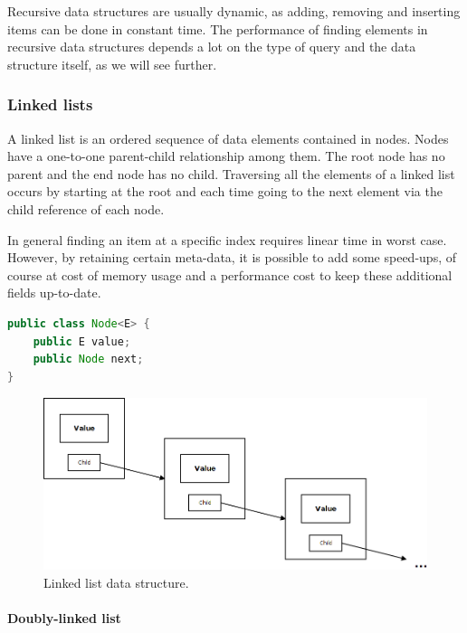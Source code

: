 Recursive data structures are usually dynamic, as adding, removing and inserting items can be done in constant time. The performance of finding elements in recursive data structures depends a lot on the type of query and the data structure itself, as we will see further.


\subsubsection{Linked lists}

A linked list is an ordered sequence of data elements contained in nodes. Nodes have a one-to-one parent-child relationship among them. The root node has no parent and the end node has no child. Traversing all the elements of a linked list occurs by starting at the root and each time going to the next element via the child reference of each node.

In general finding an item at a specific index requires linear time in worst case. However, by retaining certain meta-data, it is possible to add some speed-ups, of course at cost of memory usage and a performance cost to keep these additional fields up-to-date.

\begin{lstlisting}[language=java, caption=Node implementation for a linked list., label=listing:node-linked-list]
public class Node<E> {
	public E value;
	public Node next;
}
\end{lstlisting}

\begin{figure}[H]
	\begin{center}
		\includegraphics[width=0.7\columnwidth]{img/programming-fundamentals/linked-list}
		\caption{Linked list data structure.}
		\label{fig:linked-list}
	\end{center}
\end{figure}


\paragraph{Doubly-linked list}

